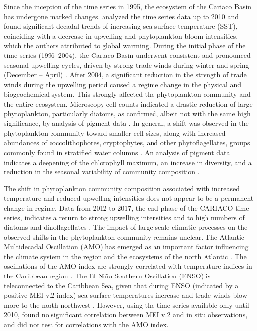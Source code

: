 \documentclass[draft]{agujournal2019}
\begin{document}
    Since the inception of the time series in 1995, the ecosystem of the Cariaco Basin has undergone marked changes.  analyzed the time series data up to 2010 and found significant decadal trends of increasing sea surface temperature (SST), coinciding with a decrease in upwelling and phytoplankton bloom intensities, which the authors attributed to global warming. During the initial phase of the time series (1996–2004), the Cariaco Basin underwent consistent and pronounced seasonal upwelling cycles, driven by strong trade winds during winter and spring (December – April) \cite{mullerkarger_annual_2001, astor_seasonal_2003}. After 2004, a significant reduction in the strength of trade winds during the upwelling period \cite{taylor_ecosystem_2012} caused a regime change in the physical and biogeochemical system. This strongly affected the phytoplankton community and the entire ecosystem. Microscopy cell counts indicated a drastic reduction of large phytoplankton, particularly diatoms, as confirmed, albeit not with the same high significance, by analysis of pigment data \cite{pinckney_phytoplankton_2015}. In general, a shift was observed in the phytoplankton community toward smaller cell sizes, along with increased abundances of coccolithophores, cryptophytes, and other phytoflagellates, groups commonly found in stratified water columns \cite{lorenzoni_characterization_2015}. An analysis of pigment data indicates a deepening of the chlorophyll maximum, an increase in diversity, and a reduction in the seasonal variability of community composition \cite{pinckney_phytoplankton_2015}. 

    The shift in phytoplankton community composition associated with increased temperature and reduced upwelling intensities does not appear to be a permanent change in regime. Data from 2012 to 2017, the end phase of the CARIACO time series, indicates a return to strong upwelling intensities and to high numbers of diatoms and dinoflagellates \cite{muller-karger_scientific_2019}.
    The impact of large-scale climatic processes on the observed shifts in the phytoplankton community remains unclear. The Atlantic Multidecadal Oscillation (AMO) has emerged as an important factor influencing the climate system in the region and the ecosystems of the north Atlantic \cite{nye_ecosystem_2014}. The oscillations of the AMO index are strongly correlated with temperature indices in the Caribbean region \cite{stephenson_changes_2014}.
    The El Niño Southern Oscillation (ENSO) is teleconnected to the Caribbean Sea, given that during ENSO (indicated by a positive MEI v.2 index) sea surface temperatures increase and trade winds blow more to the north-northwest \cite{enfield_tropical_1997}. However, using the time series available only until 2010,  found no significant correlation between MEI v.2 and in situ observations, and did not test for correlations with the AMO index.
\end{document}
